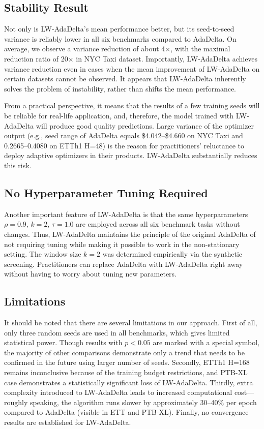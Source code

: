 \documentclass[11pt,a4paper]{article}
\begin{document}
\subsection{Stability Result}

Not only is LW-AdaDelta's mean performance better, but its seed-to-seed variance is reliably lower in all six benchmarks compared to AdaDelta. On average, we observe a variance reduction of about 4$\times$, with the maximal reduction ratio of 20$\times$ in NYC Taxi dataset. Importantly, LW-AdaDelta achieves variance reduction even in cases when the mean improvement of LW-AdaDelta on certain datasets cannot be observed. It appears that LW-AdaDelta inherently solves the problem of instability, rather than shifts the mean performance.

From a practical perspective, it means that the results of a few training seeds will be reliable for real-life application, and, therefore, the model trained with LW-AdaDelta will produce good quality predictions. Large variance of the optimizer output (e.g., seed range of AdaDelta equals \$4.042--\$4.660 on NYC Taxi and 0.2665--0.4080 on ETTh1 H=48) is the reason for practitioners' reluctance to deploy adaptive optimizers in their products. LW-AdaDelta substantially reduces this risk.

\subsection{No Hyperparameter Tuning Required}

Another important feature of LW-AdaDelta is that the same hyperparameters $\rho=0.9$, $k=2$, $\tau=1.0$ are employed across all six benchmark tasks without changes. Thus, LW-AdaDelta maintains the principle of the original AdaDelta of not requiring tuning while making it possible to work in the non-stationary setting. The window size $k=2$ was determined empirically via the synthetic screening. Practitioners can replace AdaDelta with LW-AdaDelta right away without having to worry about tuning new parameters.

\subsection{Limitations}

It should be noted that there are several limitations in our approach. First of all, only three random seeds are used in all benchmarks, which gives limited statistical power. Though results with $p<0.05$ are marked with a special symbol, the majority of other comparisons demonstrate only a trend that needs to be confirmed in the future using larger number of seeds. Secondly, ETTh1 H=168 remains inconclusive because of the training budget restrictions, and PTB-XL case demonstrates a statistically significant loss of LW-AdaDelta. Thirdly, extra complexity introduced to LW-AdaDelta leads to increased computational cost---roughly speaking, the algorithm runs slower by approximately 30--40\% per epoch compared to AdaDelta (visible in ETT and PTB-XL). Finally, no convergence results are established for LW-AdaDelta.
\end{document}
